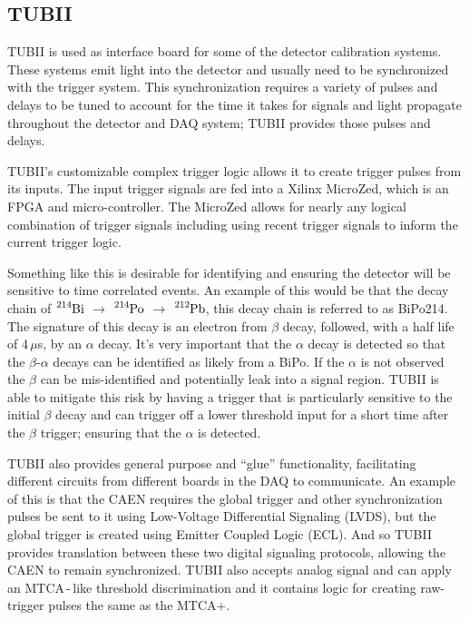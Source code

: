 \subsection{TUBII}
\label{sec:tubii}
TUBII is used as interface board for some of the detector calibration systems.
These systems emit light into the detector and usually need to be
synchronized with the trigger system. This synchronization requires
a variety of pulses and delays to be tuned to account for the time it
takes for signals and light propagate throughout the detector and DAQ
system; TUBII provides those pulses and delays.

TUBII's customizable complex trigger logic
allows it to create trigger pulses from its inputs.
The input trigger signals are fed into a Xilinx MicroZed, which is an FPGA and
micro-controller.
The MicroZed allows for nearly any logical combination of trigger signals including
using recent trigger signals to inform the current trigger logic.

Something like this is desirable for identifying and ensuring the detector will
be sensitive to time correlated events. An example of this would be that
the decay chain of $\ce{^{214}Bi}$ $\rightarrow$ $\ce{^{214}Po}$ $\rightarrow$ $\ce{^{212}Pb}$,
this decay chain is referred to as BiPo214. %
The signature of this decay is an electron from $\beta$ decay, followed, with a half
life of 4\,$\mu$s, by an $\alpha$ decay.
It's very important that the $\alpha$ decay is detected so that the $\beta$-$\alpha$
decays can be identified as likely from a BiPo. If the $\alpha$ is not observed
the $\beta$ can be mis-identified and potentially leak into a signal region.
TUBII is able to mitigate this risk by having a trigger that is particularly
sensitive to the initial $\beta$ decay and can trigger off a lower
threshold input for a short time after the $\beta$ trigger; ensuring that
the $\alpha$ is detected.

TUBII also provides general purpose and ``glue'' functionality,
facilitating different circuits from different boards in the DAQ to communicate.
An example of this is that the CAEN requires the global trigger and
other synchronization pulses be sent to it using Low-Voltage Differential
Signaling (LVDS), but the global trigger is created using Emitter Coupled
Logic (ECL).
And so TUBII provides translation between these two digital signaling protocols,
allowing the CAEN to remain synchronized.
TUBII also accepts analog signal and can apply an MTCA\,-\,like threshold
discrimination and it contains logic for creating raw-trigger pulses the
same as the MTCA+.

